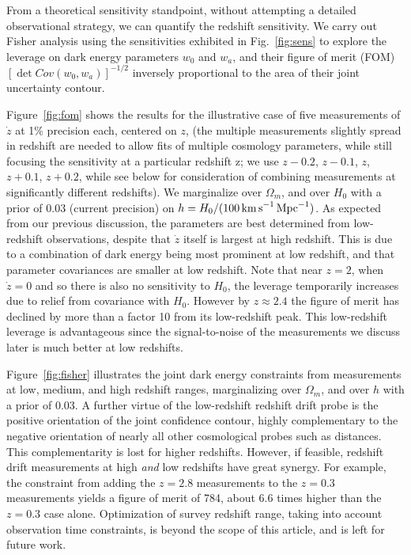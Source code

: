 \documentclass[preprint2, 10pt]{aastex}
\newcommand{\om}{\Omega_m}
\begin{document}
{From a theoretical 
sensitivity standpoint, without attempting a detailed observational 
strategy, we can quantify the redshift sensitivity. We carry out Fisher 
analysis using the sensitivities exhibited in Fig.~\ref{fig:sens} to 
explore the 
leverage on dark energy 
parameters $w_0$ and $w_a$, and their figure of merit (FOM) 
$[\det Cov(w_0,w_a)]^{-1/2}$ inversely proportional to the area of their joint 
uncertainty contour.

Figure~\ref{fig:fom} shows the results for the illustrative case of 
five measurements of $\dot z$ at 1\% precision each, centered on $z$, 
(the multiple measurements slightly spread 
in redshift are needed to allow fits of multiple cosmology parameters, 
while still focusing the sensitivity at a particular redshift z; we use 
$z-0.2$, $z-0.1$, $z$, $z+0.1$, $z+0.2$, while 
see below 
for consideration of combining measurements at significantly different redshifts). We marginalize 
over $\om$, and over $H_0$ with a 
prior of $0.03$ (current precision) on 
$h=H_0/(100\,{\rm km\,s}^{-1}\,{\rm Mpc}^{-1})$. As expected from our previous discussion, 
the parameters are best determined from low-redshift observations, despite 
that $\dot z$ itself is largest at high redshift. This is due to a 
combination of dark energy being most prominent at low redshift, and 
that parameter covariances are smaller at low redshift. Note that near 
$z=2$, when $\dot z=0$ and so there is also no sensitivity to $H_0$, 
the leverage temporarily increases due to relief from covariance with 
$H_0$. However by $z\approx2.4$ the figure of merit has declined by more 
than a factor 10 from its low-redshift peak. This low-redshift leverage is 
advantageous since the signal-to-noise of the measurements we discuss later 
is much better at low redshifts. 

Figure~\ref{fig:fisher} illustrates the joint dark energy constraints 
from measurements at low, medium, and high redshift ranges, 
marginalizing over $\om$, and over $h$ with a prior of $0.03$. 
A further virtue 
of the low-redshift redshift drift probe is the positive orientation of 
the joint confidence contour, highly complementary to the negative orientation 
of nearly all other cosmological probes such as distances. This 
complementarity is lost for higher redshifts. However, if feasible, redshift 
drift measurements at high {\it and\/} low redshifts have great synergy. 
For example, the constraint from adding the $z=2.8$ measurements to the 
$z=0.3$ measurements yields a figure of merit of 784, about 6.6 times 
higher than the $z=0.3$ case alone. 
Optimization of survey redshift range, 
taking into account observation time constraints, is beyond the scope of 
this article, and is left for future work.

}
\end{document}
